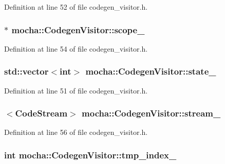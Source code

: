 Definition at line 52 of file codegen\_\-visitor.h.

\hypertarget{classmocha_1_1_codegen_visitor_a0a7ecec309937be191ab716c144a3475}{
\subsubsection[{scope\_\-}]{$\ast$ {\bf mocha::CodegenVisitor::scope\_\-}}}
\label{classmocha_1_1_codegen_visitor_a0a7ecec309937be191ab716c144a3475}


Definition at line 54 of file codegen\_\-visitor.h.

\hypertarget{classmocha_1_1_codegen_visitor_a021c80b5dabd79be55bdc0d0cde292c0}{
\subsubsection[{state\_\-}]{\setlength{\rightskip}{0pt plus 5cm}std::vector$<$int$>$ {\bf mocha::CodegenVisitor::state\_\-}}}
\label{classmocha_1_1_codegen_visitor_a021c80b5dabd79be55bdc0d0cde292c0}


Definition at line 51 of file codegen\_\-visitor.h.

\hypertarget{classmocha_1_1_codegen_visitor_a357d3e1fd1b56f1af4242c9f5af22602}{
\subsubsection[{stream\_\-}]{$<${\bf CodeStream}$>$ {\bf mocha::CodegenVisitor::stream\_\-}}}
\label{classmocha_1_1_codegen_visitor_a357d3e1fd1b56f1af4242c9f5af22602}


Definition at line 56 of file codegen\_\-visitor.h.

\hypertarget{classmocha_1_1_codegen_visitor_a4e2e4c70cc264ee5357386facf4a8342}{
\subsubsection[{tmp\_\-index\_\-}]{\setlength{\rightskip}{0pt plus 5cm}int {\bf mocha::CodegenVisitor::tmp\_\-index\_\-}}}
\label{classmocha_1_1_codegen_visitor_a4e2e4c70cc264ee5357386facf4a8342}


